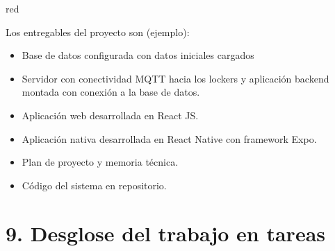 \documentclass[
11pt, %
]{charter}
\begin{document}
\begin{consigna}{red}

Los entregables del proyecto son (ejemplo):

\begin{itemize}
	\item Base de datos configurada con datos iniciales cargados
	\item Servidor con conectividad MQTT hacia los lockers y aplicación backend montada con conexión a la base de datos.
	\item Aplicación web desarrollada en React JS.
	\item Aplicación nativa desarrollada en React Native con framework Expo.
	\item Plan de proyecto y memoria técnica.
	\item Código del sistema en repositorio.
\end{itemize}

\end{consigna}

\section{9. Desglose del trabajo en tareas}
\label{sec:wbs}
\end{document}
